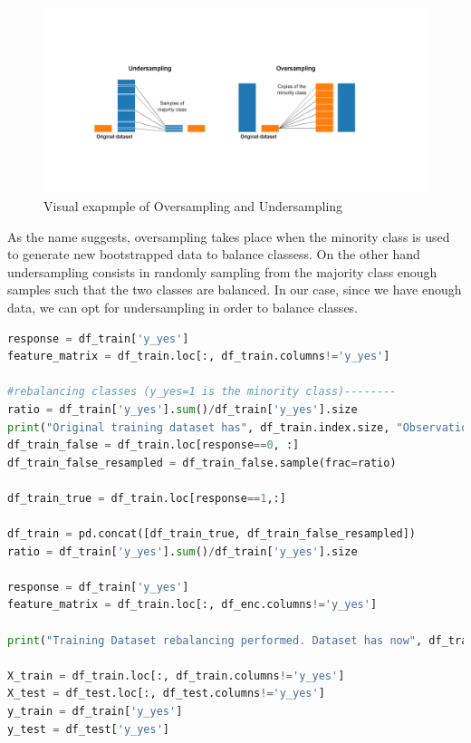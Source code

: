 \begin{figure}[H]
    \centering
    \includegraphics[scale=0.4]{pictures/undersampling-oversampling.png}

    \caption*{Visual exapmple of Oversampling and Undersampling}
\end{figure}
As the name suggests, oversampling takes place when the minority class is used to generate new bootstrapped data to balance classess. On the other hand undersampling consists in randomly sampling from the majority class enough samples such that the two classes are balanced. In our case, since we have enough data, we can opt for undersampling in order to balance classes.

\begin{lstlisting}[language=Python, caption= Data rebalancing]
response = df_train['y_yes']
feature_matrix = df_train.loc[:, df_train.columns!='y_yes']

#rebalancing classes (y_yes=1 is the minority class)--------
ratio = df_train['y_yes'].sum()/df_train['y_yes'].size
print("Original training dataset has", df_train.index.size, "Observations. \n", "Among them", response.sum(), "are positive and", response.size-response.sum(), "are negative \n Performing dataset rebalancing by undersampling... \n\n" )
df_train_false = df_train.loc[response==0, :]
df_train_false_resampled = df_train_false.sample(frac=ratio)

df_train_true = df_train.loc[response==1,:]

df_train = pd.concat([df_train_true, df_train_false_resampled])
ratio = df_train['y_yes'].sum()/df_train['y_yes'].size

response = df_train['y_yes']
feature_matrix = df_train.loc[:, df_enc.columns!='y_yes']

print("Training Dataset rebalancing performed. Dataset has now", df_train.index.size, "Observations. \n", "Among them", response.sum(), "are positive and", response.size-response.sum(), "are negative \n\n" )

X_train = df_train.loc[:, df_train.columns!='y_yes']
X_test = df_test.loc[:, df_test.columns!='y_yes']
y_train = df_train['y_yes']
y_test = df_test['y_yes']

\end{lstlisting}

